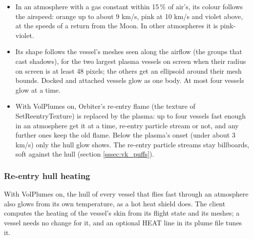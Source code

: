 \documentclass[Orbiter Developer Manual.tex]{subfiles}
\begin{document}
\begin{sloppypar}
\begin{itemize}
\item In an atmosphere with a gas constant within 15\,\% of air's, its colour follows the airspeed: orange up to about 9 km/s, pink at 10 km/s and violet above, at the speeds of a return from the Moon. In other atmospheres it is pink-violet.
\item Its shape follows the vessel's meshes seen along the airflow (the groups that cast shadows), for the two largest plasma vessels on screen when their radius on screen is at least 48 pixels; the others get an ellipsoid around their mesh bounds. Docked and attached vessels glow as one body. At most four vessels glow at a time.
\item With VolPlumes on, Orbiter's re-entry flame (the texture of SetReentryTexture) is replaced by the plasma: up to four vessels fast enough in an atmosphere get it at a time, re-entry particle stream or not, and any further ones keep the old flame. Below the plasma's onset (under about 3 km/s) only the hull glow shows. The re-entry particle streams stay billboards, soft against the hull (section \ref{sssec:vk_puffs}).
\end{itemize}


\subsubsection{Re-entry hull heating}
\label{sssec:vk_heat}
With VolPlumes on, the hull of every vessel that flies fast through an atmosphere also glows from its own temperature, as a hot heat shield does. The client computes the heating of the vessel's skin from its flight state and its meshes; a vessel needs no change for it, and an optional HEAT line in its plume file tunes it.


\end{sloppypar}
\end{document}
